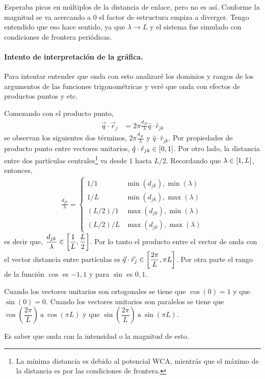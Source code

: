 \documentclass[../main.tex]{subfiles}
\begin{document}
Esperaba picos en múltiplos de la distancia de enlace, pero no es así.
Conforme la magnitud se va acercando a \(0\) el factor de estructura empiza a diverger.
Tengo entendido que eso hace sentido, ya que \(\lambda\to L\) y el sistema fue simulado con condiciones de frontera periódicas.


\paragraph{Intento de interpretación de la gráfica.}
Para intentar entender que onda con esto analizaré los dominios y rangos de los argumentos de las funciones trigonométricas y veré que onda con efectos de productos puntos y etc.

Comezando con el producto punto,
\begin{align*}
    \vec{q}\cdot\vec{r}_{j}&=2\pi\frac{d_{jk}}{\lambda}\hat{q}\cdot\hat{r}_{jk}
\end{align*}
se observan los siguientes dos términos, \(2\pi\frac{d_{jk}}{\lambda}\) y \(\hat{q}\cdot\hat{r}_{jk}\).
Por propiedades de producto punto entre vectores unitarios, \(\hat{q}\cdot\hat{r}_{jk}\in\qty[0,1]\).
Por otro lado, la distancia entre dos partículas centrales\footnote{La mínima distancia es debido al potencial WCA, mientrás que el máximo de la distancia es por las condiciones de frontera.} va desde \(1\) hasta \(L/2\).
Recordando que \(\lambda\in\qty[1,L]\), entonces,
\begin{gather*}
    \frac{d_{jk}}{\lambda} =\left\{
        \begin{array}{cc}
            1/1 & \min(d_{jk}),\min(\lambda) \\
            1/L & \min(d_{jk}),\max(\lambda) \\
            (L/2)/1 & \max(d_{jk}),\min(\lambda) \\
            (L/2)/L & \max(d_{jk}),\max(\lambda)
        \end{array}
        \right.
\end{gather*}
es decir que,
\(\dfrac{d_{jk}}{\lambda}\in\qty[\dfrac{1}{L},\dfrac{L}{2}]\).
Por lo tanto el producto entre el vector de onda con el vector distancia entre partículas es \(\vec{q}\cdot\vec{r}_{j}\in\qty[\dfrac{2\pi}{L},\pi L]\).
Por otra parte el rango de la función \(\cos\) es \(-1,1\) y para \(\sin\) es \(0,1\).

Cuando los vectores unitarios son ortogonales se tiene que \(\cos(0)=1\) y que \(\sin(0)=0\).
Cuando los vectores unitarios son paralelos se tiene que \(\cos(\dfrac{2\pi}{L})~\mathrm{a}~\cos(\pi L)\) y que \(\sin(\dfrac{2\pi}{L})~\mathrm{a}~\sin(\pi L)\).

Es saber que onda con la intensidad o la magnitud de esto.

\end{document}
